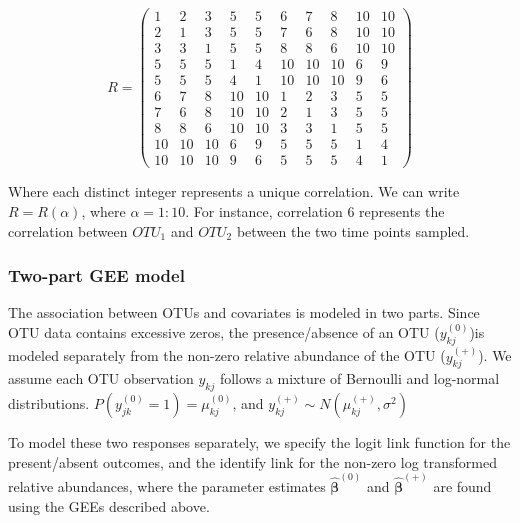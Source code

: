 \documentclass[12pt]{article}
\begin{document}
\begin{singlespace}
$$R = \begin{pmatrix}
        1 & 2 & 3 & 5 & 5 &  6 & 7 & 8 & 10 & 10 \\
        2 & 1 & 3 & 5 & 5 & 7 & 6 & 8 & 10 & 10 \\
        3 & 3 & 1 & 5 & 5 & 8 & 8 & 6 & 10 & 10 \\
        5 & 5 & 5 & 1 & 4 & 10 & 10 & 10 & 6 & 9 \\
        5 & 5 & 5 & 4 & 1 & 10 & 10 & 10  & 9 & 6 \\
        6 & 7 & 8 & 10 & 10 & 1 & 2 & 3 & 5 & 5  \\
        7 & 6 & 8 & 10 & 10 & 2 & 1 & 3 & 5 & 5  \\
        8 & 8 & 6 & 10 & 10 & 3 & 3 & 1 & 5 & 5 \\
        10 & 10 & 10 & 6 & 9 & 5 & 5 & 5 & 1 & 4  \\
        10 & 10 & 10  & 9 & 6  & 5 & 5 & 5 & 4 & 1
  \end{pmatrix}$$
\end{singlespace}
Where each distinct integer represents a unique correlation. We can write $R = R(\alpha)$, where $\alpha = 1:10$. For instance, correlation 6 represents the correlation between $OTU_1$ and $OTU_2$ between the two time points sampled.

\subsubsection{Two-part GEE model}

The association between OTUs and covariates is modeled in two parts. Since OTU data contains excessive zeros, the presence/absence of an OTU ($y_{kj}^{(0)}$)is modeled separately from the non-zero relative abundance of the OTU ($y_{kj}^{(+)}$). We assume each OTU observation $y_{kj}$ follows a mixture of Bernoulli and log-normal distributions. $P(y_{jk}^{(0)} = 1) = \mu_{kj}^{(0)}$, and $y_{kj}^{(+)} \sim N(\mu_{kj}^{(+)}, \sigma^2)$

%
%

To model these two responses separately, we specify the logit link function for the present/absent outcomes, and the identify link for the non-zero log transformed relative abundances, where the parameter estimates $\hat{\boldsymbol\beta}^{(0)}$ and $\hat{\boldsymbol\beta}^{(+)}$ are found using the GEEs described above.
\end{document}
